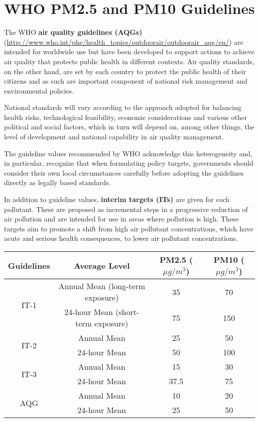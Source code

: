 \documentclass[11pt]{article}
\begin{document}
\section{WHO PM2.5 and PM10 Guidelines}
The WHO \textbf{air quality guidelines (AQGs)} (\url{http://www.who.int/phe/health_topics/outdoorair/outdoorair_aqg/en/}) are intended for worldwide use but have been developed to support actions to achieve air quality that protects public health in different contexts. Air quality standards, on the other hand, are set by each country to protect the public health of their citizens and as such are important component of national risk management and environmental policies. 

National standards will vary according to the approach adopted for balancing health risks, technological feasibility, economic considerations and various other political and social factors, which in turn will depend on, among other things, the level of development and national capability in air quality management. 

The guideline values recommended by WHO acknowledge this heterogeneity and, in particular, recognize that when formulating policy targets, governments should consider their own local circumstances carefully before adopting the guidelines directly as legally based standards.

In addition to guideline values, \textbf{interim targets (ITs)} are given for each pollutant. These are proposed as incremental steps in a progressive reduction of air pollution and are intended for use in areas where pollution is high. These targets aim to promote a shift from high air pollutant concentrations, which have acute and serious health consequences, to lower air pollutant concentrations.

\begin{table}[H]
    \centering
    \begin{tabular}{c|c|c|c}
        \hline
        Guidelines & Average Level & PM2.5 ($\mu g/m^3$) & PM10 ($\mu g/m^3$) \\
        \hline
        \multirow{2}{*}{IT-1} & Annual Mean (long-term exposure) & 35 & 70 \\
         & 24-hour Mean (short-term exposure) & 75 & 150 \\
        \hline
        \multirow{2}{*}{IT-2} & Annual Mean & 25 & 50 \\
         & 24-hour Mean & 50 & 100 \\
        \hline
        \multirow{2}{*}{IT-3} & Annual Mean & 15 & 30 \\
         & 24-hour Mean & 37.5 & 75 \\
        \hline
        \multirow{2}{*}{AQG} & Annual Mean & 10 & 20 \\
         & 24-hour Mean & 25 & 50 \\
        \hline
    \end{tabular}
    \label{tab:aqg}
\end{table}
\end{document}
